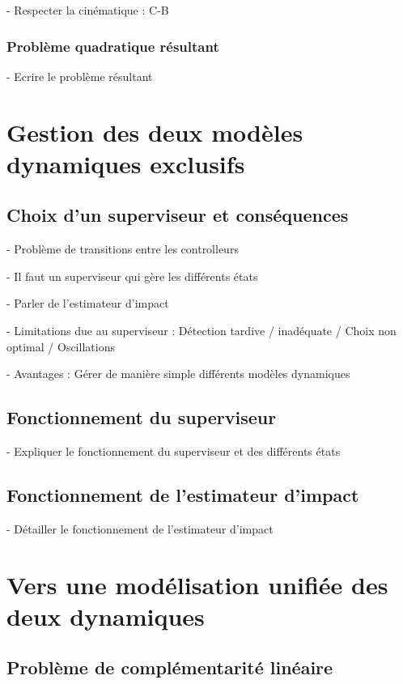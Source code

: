 				- Respecter la cinématique : C-B

			\subsubsection{Problème quadratique résultant}
		
				- Ecrire le problème résultant

	\section{Gestion des deux modèles dynamiques exclusifs}
		\label{section.superviseur}
		\subsection{Choix d'un superviseur et conséquences}

			- Problème de transitions entre les controlleurs

			- Il faut un superviseur qui gère les différents états

			- Parler de l'estimateur d'impact

			- Limitations due au superviseur : Détection tardive / inadéquate / Choix non optimal / Oscillations

			- Avantages : Gérer de manière simple différents modèles dynamiques

		\subsection{Fonctionnement du superviseur}

			- Expliquer le fonctionnement du superviseur et des différents états

		\subsection{Fonctionnement de l'estimateur d'impact}

			- Détailler le fonctionnement de l'estimateur d'impact

	\section{Vers une modélisation unifiée des deux dynamiques}
		\label{section.modelisation_unifiee}
		\subsection{Problème de complémentarité linéaire}

